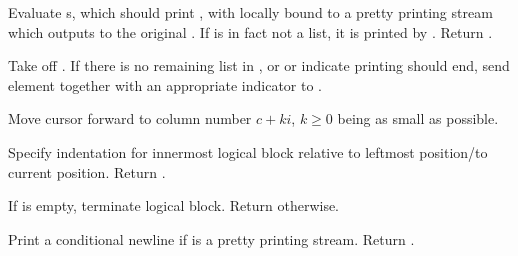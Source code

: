 \begin{LIST}{1cm}
  {
  Evaluate s, which should print , with
   locally bound to a pretty 
  printing stream which outputs to the original . If
   is in fact not a list, it is printed by
  . Return \retval{\NIL}.
  }

  \begin{LIST}{.5cm}

    {
    Take  off . If there is no remaining
    list in , or  or  indicate
    printing should end, send element together with an appropriate
    indicator to . 
  }

    {
    Move cursor forward to column number $c + ki$, $k \geq 0$ being as small
    as possible.
  }

    {
    Specify indentation for innermost logical block relative to
    leftmost position/to current position. Return \retval{\NIL}.
  }

    {
    If  is empty, terminate logical block. Return
    \retval{\NIL} otherwise.
  }
    
  \end{LIST}

  {
  Print a conditional newline if  is a pretty printing
  stream. Return \retval{\NIL}. 
  }


\end{LIST}
